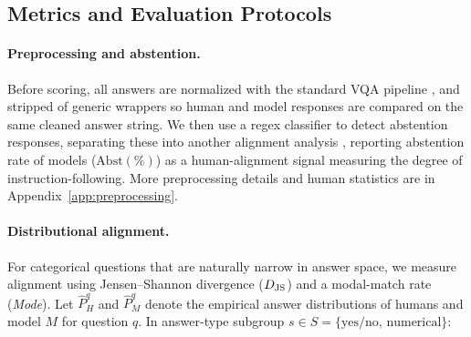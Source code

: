 \documentclass[letterpaper]{article}
\begin{document}
\subsection{Metrics and Evaluation Protocols}
\label{sec:eval_protocols}

\paragraph{Preprocessing and abstention.} Before scoring, all answers are normalized with the standard VQA pipeline
\citep{antol2015vqa}, and stripped of generic wrappers so human and model
responses are compared on the same cleaned answer string.
We then use a regex classifier to detect abstention responses, separating these into another alignment analysis
, reporting abstention rate of models ($\mathrm{Abst}(\%)$) as a human-alignment signal measuring the degree of instruction-following. %
More preprocessing details and human statistics are in Appendix~\ref{app:preprocessing}. 

\paragraph{Distributional alignment.} For categorical questions that are naturally narrow in answer space, we measure alignment using Jensen--Shannon divergence ($\djs$) and a modal-match rate (\textit{Mode}). Let $\hat{P}_{H}^{q}$ and $\hat{P}_{M}^{q}$ denote the empirical answer distributions of humans and model $M$ for question $q$. In answer-type subgroup $s\!\in\!S=\{\text{yes/no},\,\text{numerical}\}$: %
\end{document}
